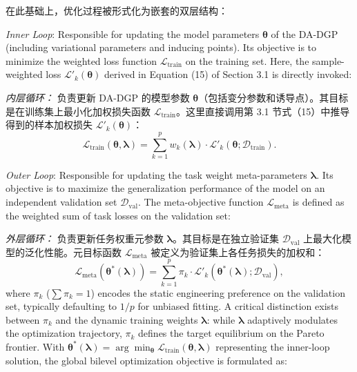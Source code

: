 \documentclass[11pt]{article}
\begin{document}
在此基础上，优化过程被形式化为嵌套的双层结构：

\textit{Inner Loop}: Responsible for updating the model parameters $\boldsymbol{\theta}$ of the DA-DGP (including variational parameters and inducing points). Its objective is to minimize the weighted loss function $\mathcal{L}_{\text{train}}$ on the training set. Here, the sample-weighted loss $\mathcal{L}'_k(\boldsymbol{\theta})$ derived in Equation (15) of Section 3.1 is directly invoked:

\textit{内层循环：} 负责更新 DA-DGP 的模型参数 $\boldsymbol{\theta}$（包括变分参数和诱导点）。其目标是在训练集上最小化加权损失函数 $\mathcal{L}_{\text{train}}$。这里直接调用第 3.1 节式（15）中推导得到的样本加权损失 $\mathcal{L}'_k(\boldsymbol{\theta})$：
\begin{equation}
	{{\mathcal{L}}_{\text{train}}}(\boldsymbol{\theta },\boldsymbol{\lambda })=\sum\limits_{k=1}^{p}{{{w}_{k}}}(\boldsymbol{\lambda })\cdot {{{\mathcal{L}}'}_{k}}(\boldsymbol{\theta };{{\mathcal{D}}_{\text{train}}}).
\end{equation}

\textit{Outer Loop}: Responsible for updating the task weight meta-parameters $\boldsymbol{\lambda}$. Its objective is to maximize the generalization performance of the model on an independent validation set $\mathcal{D}_{\text{val}}$. The meta-objective function $\mathcal{L}_{\text{meta}}$ is defined as the weighted sum of task losses on the validation set:

\textit{外层循环：} 负责更新任务权重元参数 $\boldsymbol{\lambda}$。其目标是在独立验证集 $\mathcal{D}_{\text{val}}$ 上最大化模型的泛化性能。元目标函数 $\mathcal{L}_{\text{meta}}$ 被定义为验证集上各任务损失的加权和：
\begin{equation}
	{{\mathcal{L}}_{\text{meta}}}({{\boldsymbol{\theta }}^{*}}(\boldsymbol{\lambda }))=\sum\limits_{k=1}^{p}{{{\pi }_{k}}}\cdot {{{\mathcal{L}}'}_{k}}({{\boldsymbol{\theta }}^{*}}(\boldsymbol{\lambda });{{\mathcal{D}}_{\text{val}}}),
\end{equation}
where $\pi_k$ ($\sum \pi_k = 1$) encodes the static engineering preference on the validation set, typically defaulting to $1/p$ for unbiased fitting. A critical distinction exists between $\pi_k$ and the dynamic training weights $\boldsymbol{\lambda}$: while $\boldsymbol{\lambda}$ adaptively modulates the optimization trajectory, $\pi_k$ defines the target equilibrium on the Pareto frontier. With $\boldsymbol{\theta}^*(\boldsymbol{\lambda}) = \arg \min_{\boldsymbol{\theta}} \mathcal{L}_{\text{train}}(\boldsymbol{\theta}, \boldsymbol{\lambda})$ representing the inner-loop solution, the global bilevel optimization objective is formulated as:
\end{document}
